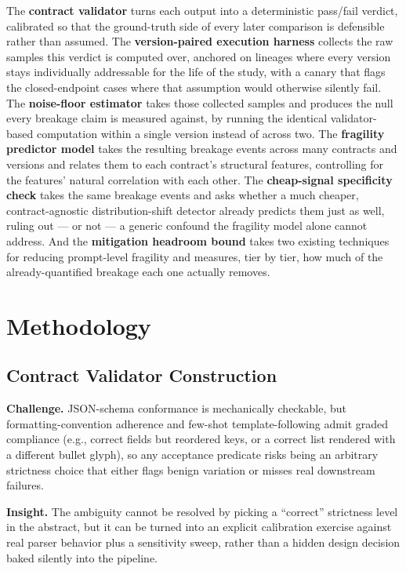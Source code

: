 \documentclass[11pt]{article}
\begin{document}
The \textbf{contract validator} turns each output into a deterministic pass/fail verdict, calibrated so that the ground-truth side of every later comparison is defensible rather than assumed. The \textbf{version-paired execution harness} collects the raw samples this verdict is computed over, anchored on lineages where every version stays individually addressable for the life of the study, with a canary that flags the closed-endpoint cases where that assumption would otherwise silently fail. The \textbf{noise-floor estimator} takes those collected samples and produces the null every breakage claim is measured against, by running the identical validator-based computation within a single version instead of across two. The \textbf{fragility predictor model} takes the resulting breakage events across many contracts and versions and relates them to each contract's structural features, controlling for the features' natural correlation with each other. The \textbf{cheap-signal specificity check} takes the same breakage events and asks whether a much cheaper, contract-agnostic distribution-shift detector already predicts them just as well, ruling out --- or not --- a generic confound the fragility model alone cannot address. And the \textbf{mitigation headroom bound} takes two existing techniques for reducing prompt-level fragility and measures, tier by tier, how much of the already-quantified breakage each one actually removes.

\section{Methodology}

\subsection{Contract Validator Construction}
\textbf{Challenge.} JSON-schema conformance is mechanically checkable, but formatting-convention adherence and few-shot template-following admit graded compliance (e.g., correct fields but reordered keys, or a correct list rendered with a different bullet glyph), so any acceptance predicate risks being an arbitrary strictness choice that either flags benign variation or misses real downstream failures.

\textbf{Insight.} The ambiguity cannot be resolved by picking a ``correct'' strictness level in the abstract, but it can be turned into an explicit calibration exercise against real parser behavior plus a sensitivity sweep, rather than a hidden design decision baked silently into the pipeline.
\end{document}
